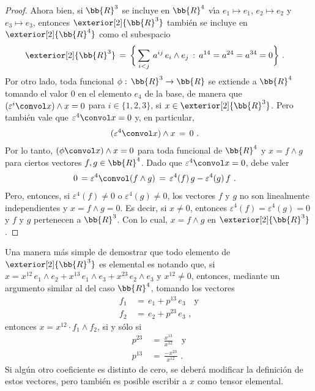 \begin{proof}
	Ahora bien, si $\bb{R}^{3}$ se incluye en $\bb{R}^{4}$
	v\'{\i}a $e_{1}\mapsto e_{1}$, $e_{2}\mapsto e_{2}$ y
	$e_{3}\mapsto e_{3}$, entonces $\exterior[2]{\bb{R}^{3}}$ tambi\'{e}n
	se incluye en $\exterior[2]{\bb{R}^{4}}$ como el subespacio
	\begin{align*}
		\exterior[2]{\bb{R}^{3}} & \,=\,\bigg\{
			\sum_{i<j}\,a^{ij}\,e_{i}\wedge e_{j}\,:\,
			a^{14}=a^{24}=a^{34}=0\bigg\}
		\text{ .}
	\end{align*}
	Por otro lado, toda funcional $\phi:\,\bb{R}^{3}\rightarrow\bb{R}$ se
	extiende a $\bb{R}^{4}$ tomando el valor $0$ en el elemento $e_{4}$
	de la base, de manera que $(\varepsilon^{i}\convol x)\wedge x=0$ para
	$i\in\{1,2,3\}$, si $x\in\exterior[2]{\bb{R}^{3}}$. Pero tambi\'{e}n
	vale que $\varepsilon^{4}\convol x=0$ y, en particular,
	\begin{align*}
		(\varepsilon^{4}\convol x)\wedge x & \,=\,0
		\text{ .}
	\end{align*}
	Por lo tanto, $(\phi\convol x)\wedge x=0$ para toda funcional de
	$\bb{R}^{4}$ y $x=f\wedge g$ para ciertos vectores $f,g\in\bb{R}^{4}$.
	Dado que $\varepsilon^{4}\convol x=0$, debe valer
	\begin{align*}
		0 & \,=\varepsilon^{4}\convol(f\wedge g) \,=\,
			\varepsilon^{4}(f)\,g-\varepsilon^{4}(g)\,f
		\text{ .}
	\end{align*}
	Pero, entonces, si $\varepsilon^{4}(f)\not=0$ o
	$\varepsilon^{4}(g)\not =0$, los vectores $f$ y $g$ no son linealmente
	independientes y $x=f\wedge g=0$. Es decir, si $x\not =0$, entonces
	$\varepsilon^{4}(f)=\varepsilon^{4}(g)=0$ y $f$ y $g$ pertenecen
	a $\bb{R}^{3}$. Con lo cual, $x=f\wedge g$ en
	$\exterior[2]{\bb{R}^{3}}$.
\end{proof}

Una manera m\'{a}s simple de demostrar que todo elemento de
$\exterior[2]{\bb{R}^{3}}$ es elemental es notando que, si
$x=x^{12}\,e_{1}\wedge e_{2}+x^{13}\,e_{1}\wedge e_{3}+%
x^{23}\,e_{2}\wedge e_{3}$ y $x^{12}\not =0$, entonces, mediante un
argumento similar al del caso $\bb{R}^{4}$, tomando los vectores
\begin{align*}
	f_{1} & \,=\,e_{1}+p^{13}\,e_{3}\quad\text{y} \\
	f_{2} & \,=\,e_{2}+p^{23}\,e_{3}\text{ ,}
\end{align*}
%
entonces $x=x^{12}\cdot f_{1}\wedge f_{2}$, si y s\'{o}lo si
\begin{align*}
	p^{23} & \,=\,\frac{x^{13}}{x^{12}}\quad\text{y} \\
	p^{13} & \,=\,\frac{-x^{23}}{x^{12}}\text{ .}
\end{align*}
%
Si alg\'{u}n otro coeficiente es distinto de cero, se deber\'{a} modificar
la definici\'{o}n de estos vectores, pero tambi\'{e}n es posible escribir
a $x$ como tensor elemental.

